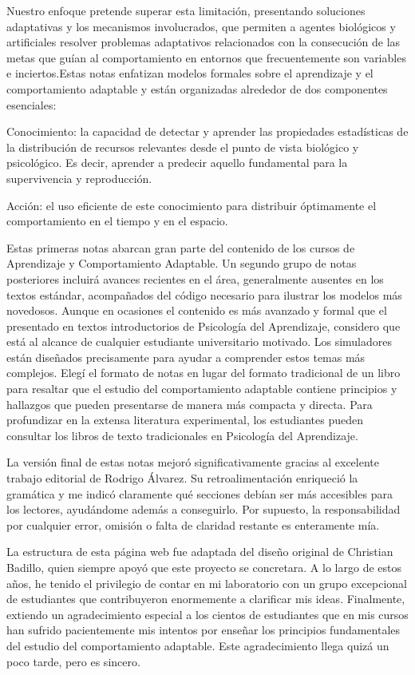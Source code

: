 \documentclass[
  letterpaper,
]{book}
\begin{document}
Nuestro enfoque pretende superar esta limitación, presentando soluciones
adaptativas y los mecanismos involucrados, que permiten a agentes
biológicos y artificiales resolver problemas adaptativos relacionados
con la consecución de las metas que guían al comportamiento en entornos
que frecuentemente son variables e inciertos.Estas notas enfatizan
modelos formales sobre el aprendizaje y el comportamiento adaptable y
están organizadas alrededor de dos componentes esenciales:

Conocimiento: la capacidad de detectar y aprender las propiedades
estadísticas de la distribución de recursos relevantes desde el punto de
vista biológico y psicológico. Es decir, aprender a predecir aquello
fundamental para la supervivencia y reproducción.

Acción: el uso eficiente de este conocimiento para distribuir
óptimamente el comportamiento en el tiempo y en el espacio.

Estas primeras notas abarcan gran parte del contenido de los cursos de
Aprendizaje y Comportamiento Adaptable. Un segundo grupo de notas
posteriores incluirá avances recientes en el área, generalmente ausentes
en los textos estándar, acompañados del código necesario para ilustrar
los modelos más novedosos. Aunque en ocasiones el contenido es más
avanzado y formal que el presentado en textos introductorios de
Psicología del Aprendizaje, considero que está al alcance de cualquier
estudiante universitario motivado. Los simuladores están diseñados
precisamente para ayudar a comprender estos temas más complejos. Elegí
el formato de notas en lugar del formato tradicional de un libro para
resaltar que el estudio del comportamiento adaptable contiene principios
y hallazgos que pueden presentarse de manera más compacta y directa.
Para profundizar en la extensa literatura experimental, los estudiantes
pueden consultar los libros de texto tradicionales en Psicología del
Aprendizaje.

La versión final de estas notas mejoró significativamente gracias al
excelente trabajo editorial de Rodrigo Álvarez. Su retroalimentación
enriqueció la gramática y me indicó claramente qué secciones debían ser
más accesibles para los lectores, ayudándome además a conseguirlo. Por
supuesto, la responsabilidad por cualquier error, omisión o falta de
claridad restante es enteramente mía.

La estructura de esta página web fue adaptada del diseño original de
Christian Badillo, quien siempre apoyó que este proyecto se concretara.
A lo largo de estos años, he tenido el privilegio de contar en mi
laboratorio con un grupo excepcional de estudiantes que contribuyeron
enormemente a clarificar mis ideas. Finalmente, extiendo un
agradecimiento especial a los cientos de estudiantes que en mis cursos
han sufrido pacientemente mis intentos por enseñar los principios
fundamentales del estudio del comportamiento adaptable. Este
agradecimiento llega quizá un poco tarde, pero es sincero.
\end{document}
